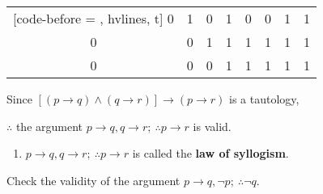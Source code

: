 \documentclass{report}
\newcounter{example}
\begin{document}
\begin{solution}
\begin{center}
\begin{NiceTabular}{|c|c|c|c|c|c|c|c|}[code-before = , hvlines, t]
            0   & 1   & 0   & 1                 & 0                 & 0                                           & 1                 & 1                                                                           \\
            0   & 0   & 1   & 1                 & 1                 & 1                                           & 1                 & 1                                                                           \\
            0   & 0   & 0   & 1                 & 1                 & 1                                           & 1                 & 1                                                                           \\
        \end{NiceTabular}
    \end{center}
    Since $[(p \rightarrow q) \land (q \rightarrow r)] \rightarrow (p \rightarrow
        r)$ is a tautology,

    $\therefore$ the argument $p \rightarrow q, q \rightarrow r;\ \therefore p
        \rightarrow r$ is valid.
\end{solution}
\begin{enumerate}[label=\textbf{NOTE: }, leftmargin=*]
    \item $p \rightarrow q, q \rightarrow r;\ \therefore p \rightarrow r$ is
          called the \textbf{law of syllogism}.
\end{enumerate}
\begin{example}
    \item Check the validity of the argument $p \rightarrow q, \neg p;\ \therefore \neg
        q$.
\end{example}
\end{document}
